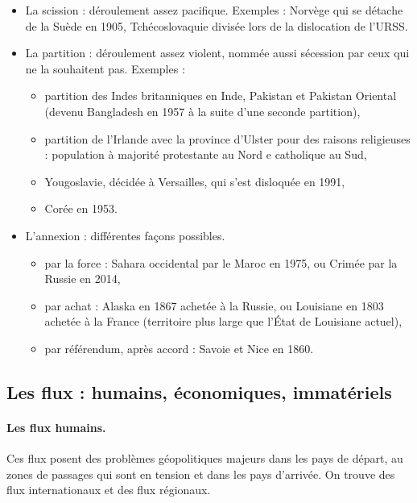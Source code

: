 \documentclass[a4paper,10pt]{article}
\begin{document}
		\begin{itemize}
		\item La scission : déroulement assez pacifique.
			Exemples : Norvège qui se détache de la Suède en 1905, Tchécoslovaquie divisée lors de la dislocation de l'URSS.
		\item La partition : déroulement assez violent, nommée aussi sécession par ceux qui ne la souhaitent pas.
			Exemples :
			\begin{itemize}
			\item[\textbullet] partition des Indes britanniques en Inde, Pakistan et Pakistan Oriental (devenu Bangladesh en 1957 à la suite d'une seconde partition),
			\item[\textbullet] partition de l'Irlande avec la province d'Ulster pour des raisons religieuses : population à majorité protestante au Nord e catholique au Sud,
			\item[\textbullet] Yougoslavie, décidée à Versailles, qui s'est disloquée en 1991,
			\item[\textbullet] Corée en 1953.
			\end{itemize}
		\item L'annexion : différentes façons possibles.
			\begin{itemize}
			\item[\textbullet] par la force : Sahara occidental par le Maroc en 1975, ou Crimée par la Russie en 2014,
			\item[\textbullet] par achat : Alaska en 1867 achetée à la Russie, ou Louisiane en 1803 achetée à la France (territoire plus large que l'État de Louisiane actuel),
			\item[\textbullet] par référendum, après accord : Savoie et Nice en 1860.
			\end{itemize}
		\end{itemize}

	\subsection{Les flux : humains, économiques, immatériels}

		\paragraph{Les flux humains.}

		Ces flux posent des problèmes géopolitiques majeurs dans les pays de départ, au zones de passages qui sont en tension et dans les pays d'arrivée.
		On trouve des flux internationaux et des flux régionaux.
\end{document}
